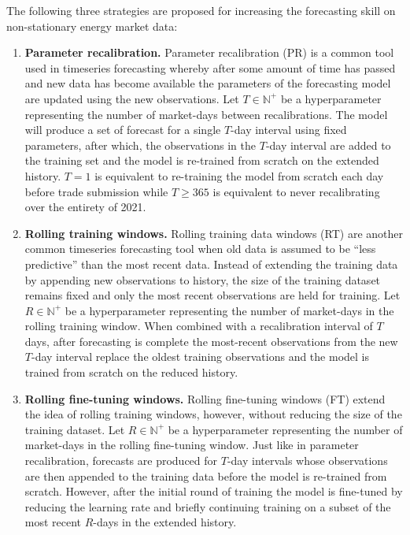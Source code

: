The following three strategies are proposed for increasing the forecasting skill on non-stationary energy
market data:
\begin{enumerate}
    \item \textbf{Parameter recalibration.} Parameter recalibration (PR) is a common tool used in timeseries
    forecasting whereby after some amount of time has passed and new data
    has become available the parameters of the forecasting model are updated
    using the new observations.
    Let $T \in \mathbb{N}^+$ be a hyperparameter representing the number of
    market-days between recalibrations.
    The model will produce a set of forecast for a single $T$-day interval
    using fixed parameters, after which, the observations in the $T$-day
    interval are added to the training set and the model is re-trained from
    scratch on the extended history.
    $T=1$ is equivalent to re-training the model from scratch each day before
    trade submission while $T \geq 365$ is equivalent to never recalibrating
    over the entirety of 2021.
    \item \textbf{Rolling training windows.} Rolling training data windows (RT) are another common timeseries
    forecasting tool when old data is assumed to be ``less predictive'' than
    the most recent data.
    Instead of extending the training data by appending new observations to
    history, the size of the training dataset remains fixed and only the most
    recent observations are held for training.
    Let $R \in \mathbb{N}^+$ be a hyperparameter representing the number of
    market-days in the rolling training window.
    When combined with a recalibration interval of $T$ days, after forecasting
    is complete the most-recent observations from the new $T$-day interval
    replace the oldest training observations and the model is trained from
    scratch on the reduced history.
    \item \textbf{Rolling fine-tuning windows.} Rolling fine-tuning windows (FT) extend the idea of rolling training
    windows, however, without reducing the size of the training dataset.
    Let $R \in \mathbb{N}^+$ be a hyperparameter representing the number of
    market-days in the rolling fine-tuning window.
    Just like in parameter recalibration, forecasts are produced for
    $T$-day intervals whose observations are then appended to the training
    data before the model is re-trained from scratch.
    However, after the initial round of training the model is fine-tuned by
    reducing the learning rate and briefly continuing training on a subset
    of the most recent $R$-days in the extended history.
\end{enumerate}

